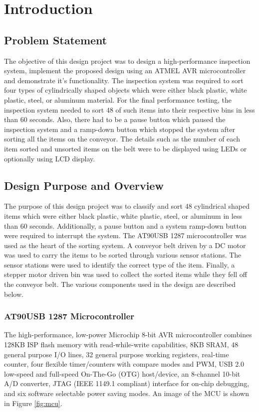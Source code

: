 \section{Introduction}\label{sec:intro}
\subsection{Problem Statement}
The objective of this design project was to design a high-performance inspection system, implement the proposed design using an ATMEL AVR microcontroller and demonstrate it's functionality. The inspection system was required to sort four types of cylindrically shaped objects which were either black plastic, white plastic, steel, or aluminum material. For the final performance testing, the inspection system needed to sort 48 of such items into their respective bins in less than 60 seconds. Also, there had to be a pause button which paused the inspection system and a ramp-down button which stopped the system after sorting all the items on the conveyor. The details such as the number of each item sorted and unsorted items on the belt were to be displayed using LEDs or optionally using LCD display.

\subsection{Design Purpose and Overview}
The purpose of this design project was to classify and sort 48 cylindrical shaped items which were either black plastic, white plastic, steel, or aluminum in less than 60 seconds. Additionally, a pause button and a system ramp-down button were required to interrupt the system. The AT90USB 1287 microcontroller was used as the heart of the sorting system. A conveyor belt driven by a DC motor was used to carry the items to be sorted through various sensor stations. The sensor stations were used to identify the correct type of the item. Finally, a stepper motor driven bin was used to collect the sorted items while they fell off the conveyor belt. The various components used in the design are described below.

\subsubsection{AT90USB 1287 Microcontroller}
The high-performance, low-power Microchip 8-bit AVR microcontroller combines 128KB ISP flash memory with read-while-write capabilities, 8KB SRAM, 48 general purpose I/O lines, 32 general purpose working registers, real-time counter, four flexible timer/counters with compare modes and PWM, USB 2.0 low-speed and full-speed On-The-Go (OTG) host/device, an 8-channel 10-bit A/D converter, JTAG (IEEE 1149.1 compliant) interface for on-chip debugging, and six software selectable power saving modes. An image of the MCU is shown in Figure \ref{fig:mcu}.

